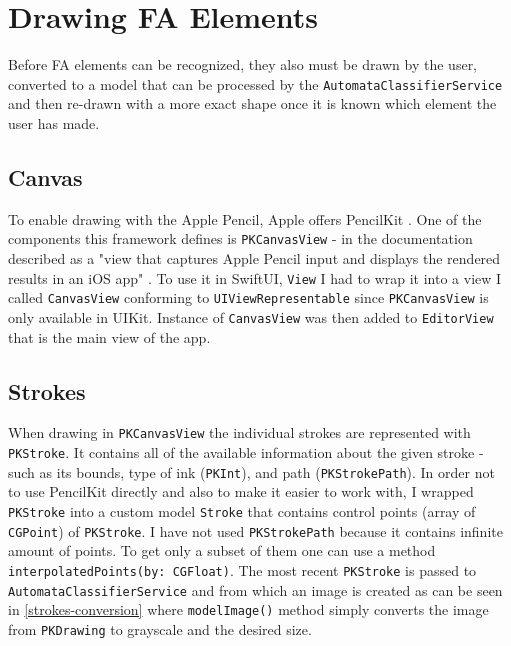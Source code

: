 \section{Drawing FA Elements}

Before FA elements can be recognized, they also must be drawn by the user, converted to a model that can be processed by the \lstinline{AutomataClassifierService} and then re-drawn with a more exact shape once it is known which element the user has made.

\subsection{Canvas}

To enable drawing with the Apple Pencil, Apple offers PencilKit \cite{pencilkit}. One of the components this framework defines is \lstinline{PKCanvasView} - in the documentation described as a "view that captures Apple Pencil input and displays the rendered results in an iOS app" \cite{pkcanvasview}. To use it in SwiftUI, \lstinline{View} I had to wrap it into a view I called \lstinline{CanvasView} conforming to \lstinline{UIViewRepresentable} since \lstinline{PKCanvasView} is only available in UIKit. Instance of \lstinline{CanvasView} was then added to \lstinline{EditorView} that is the main view of the app.

\subsection{Strokes}

When drawing in \lstinline{PKCanvasView} the individual strokes are represented with \lstinline{PKStroke}. It contains all of the available information about the given stroke - such as its bounds, type of ink (\lstinline{PKInt}), and path (\lstinline{PKStrokePath}). In order not to use PencilKit directly and also to make it easier to work with, I wrapped \lstinline{PKStroke} into a custom model \lstinline{Stroke} that contains control points (array of \lstinline{CGPoint}) of \lstinline{PKStroke}. I have not used \lstinline{PKStrokePath} because it contains infinite amount of points. To get only a subset of them one can use a method \lstinline{interpolatedPoints(by: CGFloat)}. The most recent \lstinline{PKStroke} is passed to \lstinline{AutomataClassifierService} and from which an image is created as can be seen in \ref{strokes-conversion} where \lstinline{modelImage()} method simply converts the image from \lstinline{PKDrawing} to grayscale and the desired size.

